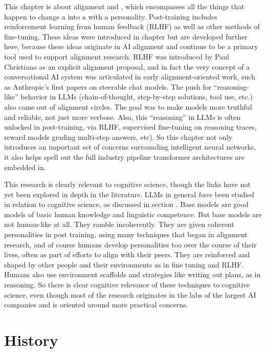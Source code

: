 This chapter is about alignment and , which encompasses all the things that happen to change a  into a  with a personality. Post-training includes reinforcement learning from human feedback (RLHF) as well as other methods of fine-tuning. These ideas were introduced in chapter  but are developed further here, because these ideas originate in AI alignment and continue to be a primary tool used to support alignment research. RLHF was introduced by Paul Christiano as an explicit alignment proposal, and in fact the very concept of a conversational AI system was articulated in early alignment-oriented work, such as Anthropic’s first papers on steerable chat models. The push for ``reasoning-like'' behavior in LLMs (chain-of-thought, step-by-step solutions, tool use, etc.) also came out of alignment circles. The goal was to make models more truthful and reliable, not just more verbose. Also, this “reasoning” in LLMs is often unlocked in post-training, via RLHF, supervised fine-tuning on reasoning traces, reward models grading multi-step answers, etc). So this chapter not only introduces an important set of  concerns surrounding intelligent neural networks, it also helps spell out the full industry pipeline transformer architectures are embedded in.

This research is clearly relevant to cognitive science, though the links have not yet been explored in depth in the literature. LLMs in general \emph{have} been studied in relation to cognitive science, as discussed in section . Base models are good models of basic human knowledge and linguistic competence. But base models are not human-like at all. They ramble incoherently. They are given coherent personalities in post training, using many techniques that began in alignment research,  and of course humans develop personalities too over the course of their lives, often as part of efforts to align with their peers. They are reinforced and shaped by other people and their environments as in fine tuning and RLHF.  Humans also use environment scaffolds and strategies like writing out plans, as in reasoning.  So there is clear cognitive relevance of these techniques to cognitive science, even though most of the research originates in the labs of the largest AI companies and is oriented around more practical concerns. 

\section{History}

